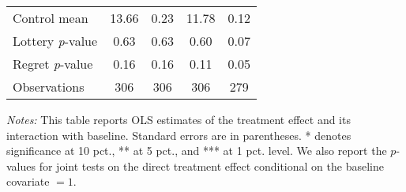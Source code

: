 \begin{table}[htbp]
{\begin{threeparttable}
\begin{tabular}{l*{4}{c}}
Control mean    &    13.66         &     0.23         &    11.78         &     0.12         \\
Lottery \emph{p}-value&     0.63         &     0.63         &     0.60         &     0.07         \\
Regret \emph{p}-value&     0.16         &     0.16         &     0.11         &     0.05         \\
Observations    &      306         &      306         &      306         &      279         \\
\bottomrule \end{tabular} \begin{tablenotes}[flushleft] \footnotesize \item \emph{Notes:} This table reports OLS estimates of the treatment effect and its interaction with baseline. Standard errors are in parentheses. * denotes significance at 10 pct., ** at 5 pct., and *** at 1 pct. level. We also report the \(p\)-values for joint tests on the direct treatment effect conditional on the baseline covariate $= 1$. \end{tablenotes} \end{threeparttable} } \end{table}
